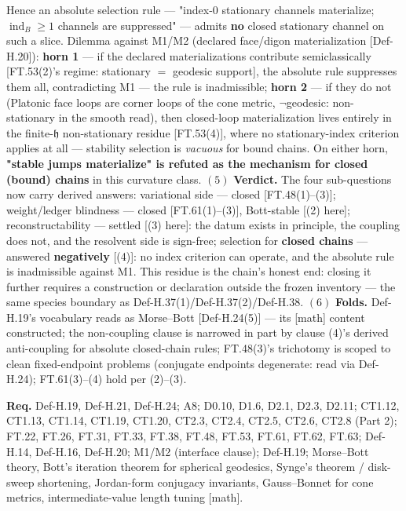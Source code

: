 \begin{theorem}
Hence an absolute selection rule — "index-0 stationary channels materialize; $\operatorname{ind}_B\ge1$ channels are suppressed" — admits \textbf{no} closed stationary channel on such a slice. Dilemma against M1/M2 (declared face/digon materialization [Def-H.20]): \textbf{horn 1} — if the declared materializations contribute semiclassically [FT.53(2)'s regime: stationary $=$ geodesic support], the absolute rule suppresses them all, contradicting M1 — the rule is inadmissible; \textbf{horn 2} — if they do not (Platonic face loops are corner loops of the cone metric, $\neg$geodesic: non-stationary in the smooth read), then closed-loop materialization lives entirely in the finite-$\mathfrak h$ non-stationary residue [FT.53(4)], where no stationary-index criterion applies at all — stability selection is \textit{vacuous} for bound chains. On either horn, \textbf{"stable jumps materialize" is refuted as the mechanism for closed (bound) chains} in this curvature class. $(5)$ \textbf{Verdict.} The four sub-questions  now carry derived answers: variational side — closed [FT.48(1)–(3)]; weight/ledger blindness — closed [FT.61(1)–(3)], Bott-stable [(2) here]; reconstructability — settled [(3) here]: the datum exists in principle, the coupling does not, and the resolvent side is sign-free; selection for \textbf{closed chains} — answered \textbf{negatively} [(4)]: no index criterion can operate, and the absolute rule is inadmissible against M1. This residue is the chain's honest end: closing it further requires a construction or declaration outside the frozen inventory — the same species boundary as Def-H.37(1)/Def-H.37(2)/Def-H.38. $(6)$ \textbf{Folds.} Def-H.19's vocabulary reads as Morse–Bott [Def-H.24(5)] — its [math] content constructed; the non-coupling clause is narrowed in part by clause (4)'s derived anti-coupling for absolute closed-chain rules; FT.48(3)'s trichotomy is scoped to clean fixed-endpoint problems (conjugate endpoints degenerate: read via Def-H.24); FT.61(3)–(4) hold per (2)–(3).

\textbf{Req.} Def-H.19, Def-H.21, Def-H.24; A8; D0.10, D1.6, D2.1, D2.3, D2.11; CT1.12, CT1.13, CT1.14, CT1.19, CT1.20, CT2.3, CT2.4, CT2.5, CT2.6, CT2.8 (Part 2); FT.22, FT.26, FT.31, FT.33, FT.38, FT.48, FT.53, FT.61, FT.62, FT.63; Def-H.14, Def-H.16, Def-H.20; M1/M2 (interface clause); Def-H.19; Morse–Bott theory, Bott's iteration theorem for spherical geodesics, Synge's theorem / disk-sweep shortening, Jordan-form conjugacy invariants, Gauss–Bonnet for cone metrics, intermediate-value length tuning [math].


\end{theorem}
